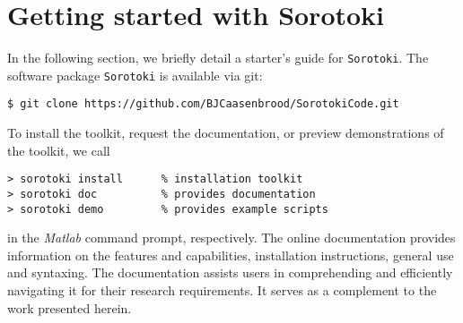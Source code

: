 \section{Getting started with {Sorotoki}}
\label{sec:C5:open_softrobots}
In the following section, we briefly detail a starter's guide for \texttt{Sorotoki}. The software package \texttt{Sorotoki} is available via git:
%
\begin{lstlisting}[style=terminal]
$ git clone https://github.com/BJCaasenbrood/SorotokiCode.git
\end{lstlisting}
%
To install the toolkit, request the documentation, or preview demonstrations of the toolkit, we call 
%
\begin{lstlisting}[style=Matlabterminal]
> sorotoki install      % installation toolkit
> sorotoki doc          % provides documentation
> sorotoki demo         % provides example scripts
\end{lstlisting}
%
in the \textit{Matlab} command prompt, respectively. The online documentation provides information on the features and capabilities, installation instructions, general use and syntaxing. The documentation assists users in comprehending and efficiently navigating it for their research requirements. It serves as a complement to the work presented herein.  